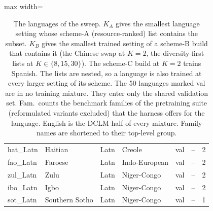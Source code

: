 \begin{table}[p]
\begin{minipage}[t]{0.49\textwidth}
\begin{adjustbox}{max width=\linewidth}
\begin{tabular}[t]{llllrrr}
hat\_Latn & Haitian & Latn & Creole & val & -- & 2 \\
fao\_Latn & Faroese & Latn & Indo-European & val & -- & 2 \\
zul\_Latn & Zulu & Latn & Niger-Congo & val & -- & 2 \\
ibo\_Latn & Igbo & Latn & Niger-Congo & val & -- & 2 \\
sot\_Latn & Southern Sotho & Latn & Niger-Congo & val & -- & 1 \\
\bottomrule
\end{tabular}
\end{adjustbox}
\end{minipage}
\caption{The languages of the sweep. $K_A$ gives the smallest language setting whose scheme-A (resource-ranked) list contains the subset. $K_B$ gives the smallest trained setting of a scheme-B build that contains it (the Chinese swap at $K=2$, the diversity-first lists at $K \in \{8, 15, 30\}$). The scheme-C build at $K=2$ trains Spanish. The lists are nested, so a language is also trained at every larger setting of its scheme. The 50 languages marked val are in no training mixture. They enter only the shared validation set. Fam.\ counts the benchmark families of the pretraining suite (reformulated variants excluded) that the harness offers for the language. English is the DCLM half of every mixture. Family names are shortened to their top-level group.}
\label{tab:app-languages}
\end{table}

